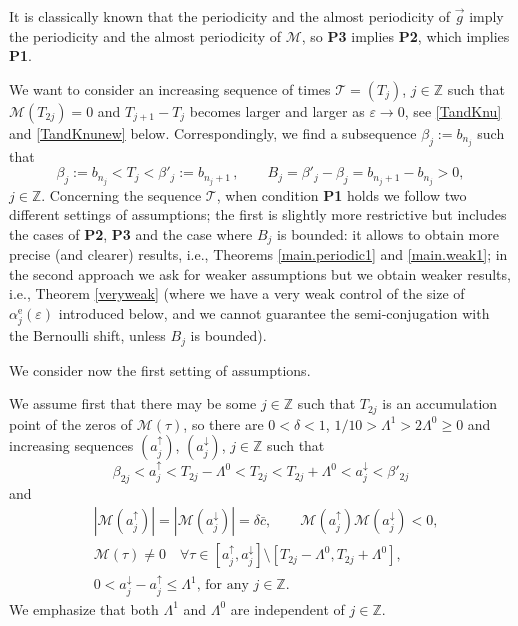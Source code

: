 \documentclass[10pt]{article}
\numberwithin{equation}{section}
\def\ep{\varepsilon}
\def\Z{{\mathbb Z}}
\def\ee{{\mathrm e}}
\def\MM{{\mathcal M}}
\def\dd{\delta}
\def\aup{a^{\uparrow}}
\def\adown{a^{\downarrow}}
\def\lzero{\Lambda^0}
\def\l1{\Lambda^{1}}
\def\g{\vec{g}}
\newcommand\assump[1]{{\rm\textbf{#1}}}
\theoremstyle{definition}
\theoremstyle{remark}
\begin{document}
It is classically known that the periodicity and the almost periodicity of $\g$ imply the periodicity and the almost periodicity
of $\MM$, so   \assump{P3} implies \assump{P2}, which implies \assump{P1}.

We want to consider an increasing sequence of times $\mathcal{T}=(T_j)$, $j \in \Z$ such that   $\MM(T_{2j})=0$
and  $T_{j+1}-T_j$ becomes larger and larger as $\ep \to 0$, see \eqref{TandKnu} and \eqref{TandKnunew} below.
Correspondingly, we find a subsequence $\beta_j:=b_{n_j}$ such that
\begin{equation}\label{defkj}
  \beta_j:=b_{n_j} <T_j < \beta'_j:= b_{n_j +1} \, , \qquad  B_{j}=\beta'_j- \beta_j= b_{n_j+1}-b_{n_j} >0,
\end{equation}
$j \in \Z$.
 Concerning the sequence $\mathcal{T}$, when condition \assump{P1} holds
we follow two different settings of assumptions; the first is slightly more
restrictive but  includes the cases of \assump{P2}, \assump{P3} and the case where $B_j$ is bounded:  it allows to obtain more precise
(and clearer) results,
i.e., Theorems \ref{main.periodic1} and \ref{main.weak1}; in the second approach we
ask for weaker assumptions but we obtain weaker results, i.e., Theorem \ref{veryweak} (where we have a very weak control of the size of
$\alpha^{\ee}_j(\ep)$ introduced below,  and we cannot guarantee the semi-conjugation with the Bernoulli shift, unless $B_j$ is bounded).


We consider now the first setting of assumptions.




We assume first that   there may be some $j \in \Z$ such that $T_{2j}$ is an accumulation point of the zeros of $\MM(\tau)$,
so there are  $0<\dd<1 $, $1/10>\l1 >2\lzero \ge 0$   and increasing sequences $(\aup_j)$, $(\adown_j)$,
$j\in \Z$   such that
$$\beta_{2j}<\aup_j<T_{2j}-\lzero<T_{2j}<T_{2j}+\lzero<\adown_{j}<\beta'_{2j}$$  and
\begin{equation}\label{minimal}
\begin{split}
 & |\MM(\aup_j)|=|\MM(\adown_j)|= \dd \bar{c}, \qquad \MM(\aup_j) \MM(\adown_j) <0, \\ & \MM(\tau) \ne 0 \quad \forall \tau \in [\aup_j,
  \adown_j] \setminus [T_{2j}-\lzero, T_{2j}+\lzero],\\
  & \textrm{$0<\adown_j-\aup_j \le \l1$,
for any $j \in \Z$.}
  \end{split}
\end{equation}
We emphasize that  both $\l1$ and $\lzero$ are independent of $j \in \Z$.
\end{document}
